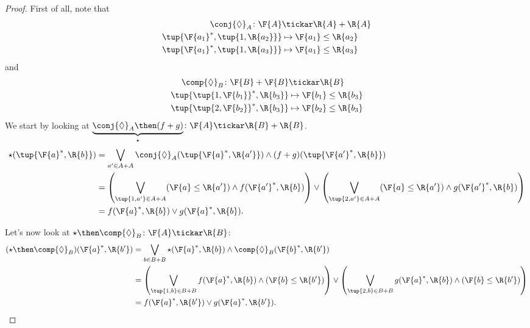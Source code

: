 \begin{proof}
First of all, note that 
\begin{equation}
    \begin{aligned}
    \conj{\Diamond}_A\colon \F{A}&\tickar \R{A}+\R{A}\\
    \tup{\F{a_1}^*,\tup{1,\R{a_2}}}&\mapsto \F{a_1}\leq \R{a_2}\\
    \tup{\F{a_1}^*,\tup{1,\R{a_3}}}&\mapsto \F{a_1}\leq \R{a_3}
    \end{aligned}
\end{equation}
and
\begin{equation}
    \begin{aligned}
    \comp{\Diamond}_B\colon \F{B}+\F{B}&\tickar \R{B}\\
    \tup{\tup{1,\F{b_1}}^*,\R{b_3}}&\mapsto \F{b_1}\leq \R{b_3}\\
    \tup{\tup{2,\F{b_2}}^*,\R{b_3}}&\mapsto \F{b_2}\leq \R{b_3}
    \end{aligned}
\end{equation}
We start by looking at $\underbrace{\conj{\Diamond}_A\then (f+g)}_{\star}\colon \F{A} \tickar \R{B}+\R{B}$. 
\begin{equation}
    \begin{aligned}
    \star (\tup{\F{a}^*,\R{b}})&=\bigvee_{a'\in A+A} \conj{\Diamond}_A(\tup{\F{a}^*,\R{a'}})\wedge (f+g)(\tup{\F{a'}^*,\R{b}})\\
    &=\left( \bigvee_{\tup{1,a'}\in A+A} (\F{a}\leq \R{a'})\wedge f(\F{a'}^*,\R{b}) \right)\vee \left( \bigvee_{\tup{2,a'}\in A+A} (\F{a}\leq \R{a'})\wedge g(\F{a'}^*,\R{b}) \right)\\
    &=f(\F{a}^*,\R{b}) \vee g(\F{a}^*,\R{b}).
    \end{aligned}
\end{equation}

Let's now look at $\star \then \comp{\Diamond}_B\colon \F{A} \tickar \R{B}$:
\begin{equation}
    \begin{aligned}
    (\star \then \comp{\Diamond}_B)(\F{a}^*,\R{b'})&=\bigvee_{b\in B+B} \star(\F{a}^*,\R{b})\wedge \comp{\Diamond}_B(\F{b}^*,\R{b'}) \\
    &=\left(\bigvee_{\tup{1,b}\in B+B} f(\F{a}^*,\R{b}) \wedge (\F{b}\leq \R{b'})\right) \vee 
    \left(\bigvee_{\tup{2,b}\in B+B} g(\F{a}^*,\R{b}) \wedge (\F{b}\leq \R{b'})\right)\\
    &=f(\F{a}^*,\R{b'})\vee g(\F{a}^*,\R{b'}).
    \end{aligned}
\end{equation}
\end{proof}

